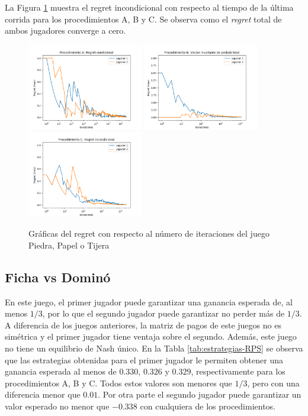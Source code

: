 La Figura \ref{fig:regret-RPS} muestra el regret incondicional con respecto al tiempo de la última corrida para los procedimientos A, B y C. Se observa como el \textit{regret} total de ambos jugadores converge a cero.

\begin{figure}[hbt!]
\caption{Gráficas del regret con respecto al número de iteraciones del juego Piedra, Papel o Tijera}
\label{fig:regret-RPS}
\centering
\includegraphics[width=0.45\textwidth]{graficas/RPS/procedimiento-A.png}
\includegraphics[width=0.45\textwidth]{graficas/RPS/procedimiento-B.png}
\includegraphics[width=0.45\textwidth]{graficas/RPS/procedimiento-C.png}
\end{figure}

\subsection{Ficha vs Dominó}

En este juego, el primer jugador puede garantizar una ganancia esperada de, al menos $1/3$, por lo que el segundo jugador puede garantizar no perder más de $1/3$. A diferencia de los juegos anteriores, la matriz de pagos de este juegos no es simétrica y el primer jugador tiene ventaja sobre el segundo. Además, este juego no tiene un equilibrio de Nash único. En la Tabla \ref{tab:estrategias-RPS} se observa que las estrategias obtenidas para el primer jugador le permiten obtener una ganancia esperada al menos de $0.330$, $0.326$ y $0.329$, respectivamente para los procedimientos A, B y C. Todos estos valores son menores que $1/3$, pero con una diferencia menor que $0.01$. Por otra parte el segundo jugador puede garantizar un valor esperado no menor que $-0.338$ con cualquiera de los procedimientos.

